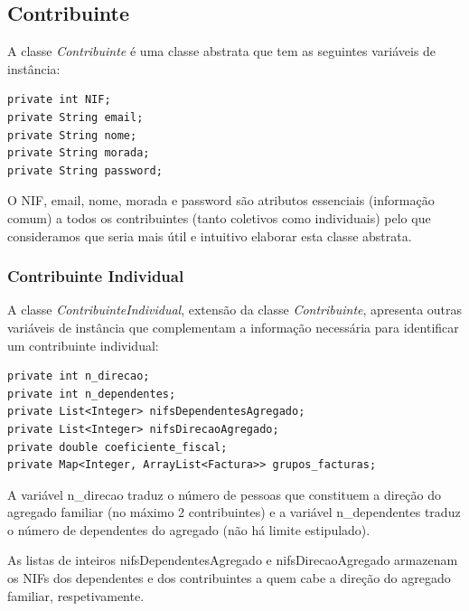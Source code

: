 \documentclass[a4paper]{article}
\begin{document}
\subsection{Contribuinte}
\label{sec:contribuinte}

A classe \emph{Contribuinte} é uma classe abstrata que tem as seguintes
variáveis de instância:

\begin{verbatim}
private int NIF;
private String email;
private String nome;
private String morada;
private String password;
\end{verbatim}

\vspace{0.2cm}

O \textsf{NIF}, \textsf{email}, \textsf{nome}, \textsf{morada} e
\textsf{password} são atributos essenciais (informação comum)
a todos os contribuintes (tanto coletivos como individuais) pelo que
consideramos que seria mais útil e intuitivo elaborar esta classe abstrata.



\subsubsection{Contribuinte Individual}
\label{sec:contribuinteindividual}

A classe \emph{ContribuinteIndividual}, extensão da classe \emph{Contribuinte},
apresenta outras variáveis de instância que complementam a informação necessária
para identificar um contribuinte individual:

\begin{verbatim}
private int n_direcao;
private int n_dependentes;
private List<Integer> nifsDependentesAgregado;
private List<Integer> nifsDirecaoAgregado;
private double coeficiente_fiscal;
private Map<Integer, ArrayList<Factura>> grupos_facturas;
\end{verbatim}

\vspace{0.2cm}

A variável \textsf{n\_direcao} traduz o número de pessoas que constituem a
direção do agregado familiar (no máximo 2 contribuintes) e a variável \textsf{n\_dependentes}
traduz o número de dependentes do agregado (não há limite estipulado).

As listas de inteiros \textsf{nifsDependentesAgregado} e
\textsf{nifsDirecaoAgregado} armazenam os NIFs dos dependentes e dos
contribuintes a quem cabe a direção do agregado familiar, respetivamente.
\end{document}
